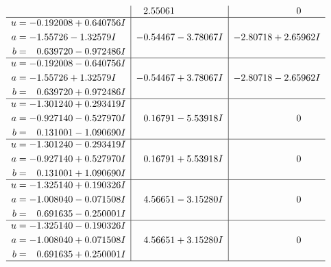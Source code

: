 \documentclass[1p]{elsarticle_modified}
\theoremstyle{definition}
\begin{document}
$$\begin{array}{c|c|c}
 & \phantom{-}2.55061\phantom{ +0.000000I} & \phantom{-0.000000 } 0 \\ \hline\begin{aligned}
u &= -0.192008 + 0.640756 I \\
a &= -1.55726 - 1.32579 I \\
b &= \phantom{-}0.639720 - 0.972486 I\end{aligned}
 & -0.54467 - 3.78067 I & -2.80718 + 2.65962 I \\ \hline\begin{aligned}
u &= -0.192008 - 0.640756 I \\
a &= -1.55726 + 1.32579 I \\
b &= \phantom{-}0.639720 + 0.972486 I\end{aligned}
 & -0.54467 + 3.78067 I & -2.80718 - 2.65962 I \\ \hline\begin{aligned}
u &= -1.301240 + 0.293419 I \\
a &= -0.927140 - 0.527970 I \\
b &= \phantom{-}0.131001 - 1.090690 I\end{aligned}
 & \phantom{-}0.16791 - 5.53918 I & \phantom{-0.000000 } 0 \\ \hline\begin{aligned}
u &= -1.301240 - 0.293419 I \\
a &= -0.927140 + 0.527970 I \\
b &= \phantom{-}0.131001 + 1.090690 I\end{aligned}
 & \phantom{-}0.16791 + 5.53918 I & \phantom{-0.000000 } 0 \\ \hline\begin{aligned}
u &= -1.325140 + 0.190326 I \\
a &= -1.008040 - 0.071508 I \\
b &= \phantom{-}0.691635 - 0.250001 I\end{aligned}
 & \phantom{-}4.56651 - 3.15280 I & \phantom{-0.000000 } 0 \\ \hline\begin{aligned}
u &= -1.325140 - 0.190326 I \\
a &= -1.008040 + 0.071508 I \\
b &= \phantom{-}0.691635 + 0.250001 I\end{aligned}
 & \phantom{-}4.56651 + 3.15280 I & \phantom{-0.000000 } 0\\
 \hline 
 \end{array}$$\newpage$$\begin{array}{c|c|c}  

\end{array}$$
\end{document}
